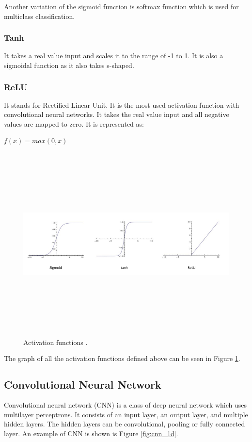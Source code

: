 Another variation of the sigmoid function is softmax function which is used for multiclass classification.

\subsubsection{Tanh}
It takes a real value input and scales it to the range of -1 to 1. It is also a sigmoidal function as it also takes s-shaped.


\subsubsection{ReLU}
It stands for Rectified Linear Unit. It is the most used activation function with convolutional neural networks\cite{ujjwalkarn}. It takes the real value input and all negative values are mapped to zero. It is represented as:

\begin{center}
	$f(x) = max(0, x)$
\end{center}

\begin{figure}[htpb]
	\centering
	\includegraphics[width=15cm,height=10cm,keepaspectratio=true]{images/act-funcs}
	\caption{
		Activation functions \cite{ujjwalkarn}.
	}
	\label{fig:funcs}
\end{figure}

The graph of all the activation functions defined above can be seen in Figure \ref{fig:funcs}.

\subsection{Convolutional Neural Network}
Convolutional neural network (CNN) is a class of deep neural network which uses multilayer perceptrons. It consists of an input layer, an output layer, and multiple hidden layers. The hidden layers can be convolutional, pooling or fully connected layer. An example of CNN is shown is Figure \ref{fig:cnn_1d}. 

